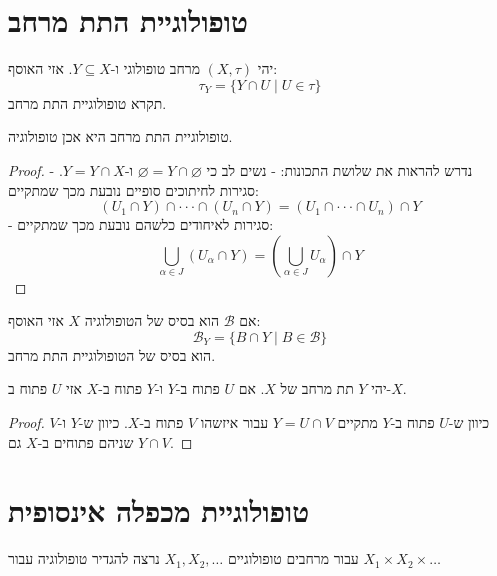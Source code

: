\documentclass{tstextbook}
\begin{document}
\section{טופולוגיית התת מרחב}

\begin{definition}
יהי \((X,\tau)\) מרחב טופולוגי ו-\(Y\subseteq X\). אזי האוסף:
$$\tau_{Y}=\{ Y\cap  U\mid U \in \tau \}$$
תקרא טופולוגיית התת מרחב.

\end{definition}
\begin{lemma}
טופולוגיית התת מרחב היא אכן טופולוגיה.

\end{lemma}
\begin{proof}
נדרש להראות את שלושת התכונות:
- נשים לב כי \(\varnothing=Y\cap \varnothing\) ו-\(Y=Y\cap X\).
- סגירות לחיתוכים סופיים נובעת מכך שמתקיים:
$$(U_{1}\cap Y)\cap\cdot\cdot\cdot\cap(U_{n}\cap Y)=(U_{1}\cap\cdot\cdot\cdot\cap U_{n})\cap Y$$
- סגירות לאיחודים כלשהם נובעת מכך שמתקיים:
$$\bigcup_{\alpha\in J}(U_{\alpha}\cap Y)=(\bigcup_{\alpha\in J}U_{\alpha})\cap Y$$

\end{proof}
\begin{proposition}
אם \(\mathcal{B}\) הוא בסיס של הטופולוגיה \(X\) אזי האוסף:
$$\mathcal{B} _{Y}=\{ B\cap  Y \mid B \in \mathcal{B}  \}$$
הוא בסיס של הטופולוגיית התת מרחב.

\end{proposition}
\begin{proposition}
יהי \(Y\) תת מרחב של \(X\). אם \(U\) פתוח ב-\(Y\) ו-\(Y\) פתוח ב-\(X\) אזי \(U\) פתוח ב-\(X\).

\end{proposition}
\begin{proof}
כיוון ש-\(U\) פתוח ב-\(Y\) מתקיים \(Y=U\cap V\) עבור איזשהו \(V\) פתוח ב-\(X\). כיוון ש-\(Y\) ו-\(V\) שניהם פתוחים ב-\(X\) גם \(Y \cap V\).

\end{proof}
\section{טופולוגיית מכפלה אינסופית}

עבור מרחבים טופולוגיים \(X_{1},X_{2},\dots\) נרצה להגדיר טופולוגיה עבור \(X_{1}\times X_{2}\times\dots\)
\end{document}
